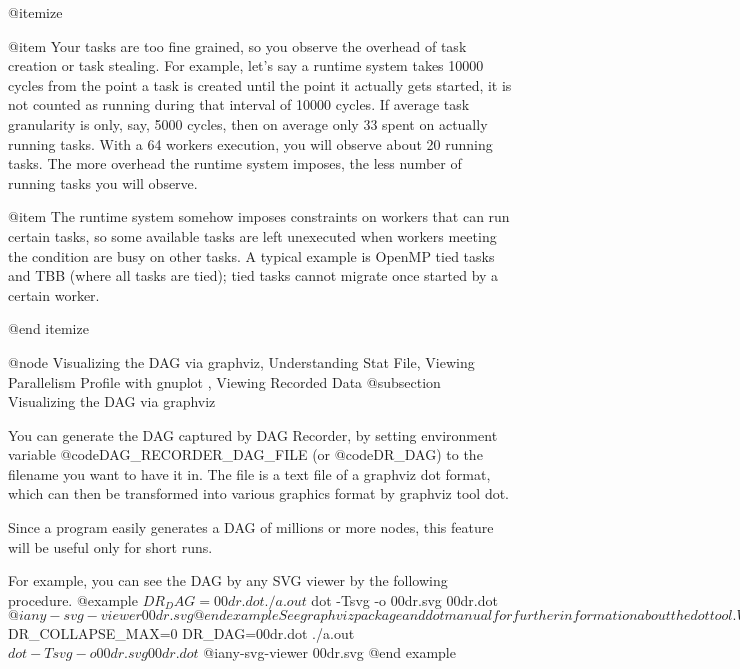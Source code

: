 @itemize

@item Your tasks are too fine grained, so you observe the overhead
of task creation or task stealing.  For example, let's say a runtime
system takes 10000 cycles from the point a task is created until the
point it actually gets started, it is not counted as running during that
interval of 10000 cycles.  If average task granularity is only, say,
5000 cycles, then on average only 33%
spent on actually running tasks.  With a 64 workers execution, you will
observe about 20 running tasks.  The more overhead the runtime system
imposes, the less number of running tasks you will observe.

@item The runtime system somehow imposes constraints on workers that can run 
certain tasks, so some available tasks are left unexecuted when workers
meeting the condition are busy on other tasks.  A typical example is
OpenMP tied tasks and TBB (where all tasks are tied); tied tasks cannot
migrate once started by a certain worker.

@end itemize

@node Visualizing the DAG via graphviz, Understanding Stat File, Viewing Parallelism Profile with gnuplot , Viewing Recorded Data
@subsection Visualizing the DAG via graphviz

You can generate the DAG captured by DAG Recorder, by setting
environment variable @code{DAG_RECORDER_DAG_FILE} 
(or @code{DR_DAG}) to the filename
you want to have it in.  The file is a text file of a graphviz dot
format, which can then be transformed into various graphics format by
graphviz tool dot.

Since a program easily generates a DAG of millions or more nodes, this
feature will be useful only for short runs.  

For example, you can see the DAG by any SVG viewer by the following
procedure.
@example
$ DR_DAG=00dr.dot ./a.out
$ dot -Tsvg -o 00dr.svg 00dr.dot 
$ @i{any-svg-viewer} 00dr.svg
@end example

See graphviz package and dot manual for further information about the
dot tool.

When you use this feature to visualize the true topology of the DAG your
program generated, you might want to turn off the subgraph contraction
algorithm DAG Recorder implements to save space.  To this end, you can
set @code{DR_COLLAPSE_MAX} environment variable to zero.

@example
$ DR_COLLAPSE_MAX=0 DR_DAG=00dr.dot ./a.out
$ dot -Tsvg -o 00dr.svg 00dr.dot 
$ @i{any-svg-viewer} 00dr.svg
@end example

